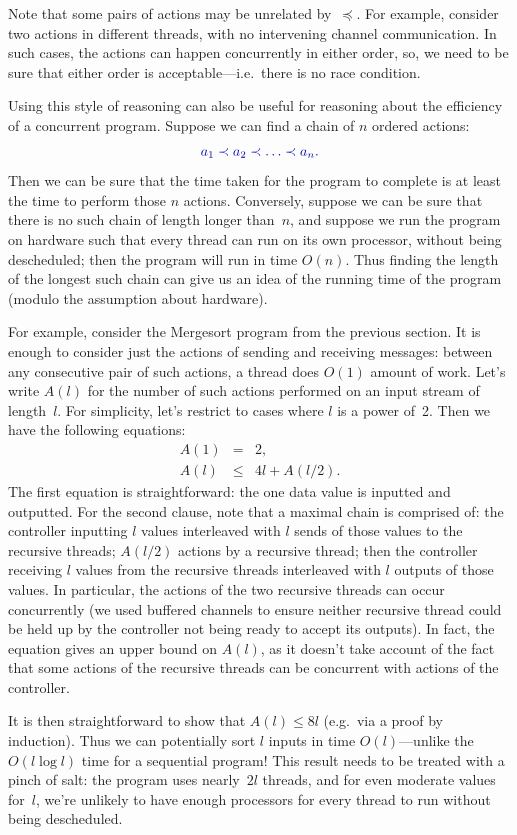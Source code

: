 Note that some pairs of actions may be unrelated by~$\preceq$.  For example,
consider two actions in different threads, with no intervening channel
communication.  In such cases, the actions can happen concurrently in either
order, so, we need to be sure that either order is acceptable---i.e.~there is
no race condition.

Using this style of reasoning can also be useful for reasoning about the
efficiency of a concurrent program.  Suppose we can find a chain of $n$
ordered actions:
\[
\mstyle
a_1 \prec a_2 \prec \ldots \prec a_n. 
\]
Then we can be sure that the time taken for the program to complete is at
least the time to perform those $n$ actions.  Conversely, suppose we can be
sure that there is no such chain of length longer than~$n$, and suppose we run
the program on hardware such that every thread can run on its own processor,
without being descheduled; then the program will run in time $O(n)$.  Thus
finding the length of the longest such chain can give us an idea of the
running time of the program (modulo the assumption about hardware).

For example, consider the Mergesort program from the previous section.  It is
enough to consider just the actions of sending and receiving messages: between
any consecutive pair of such actions, a thread does $O(1)$ amount of work.
Let's write $A(l)$ for the number of such actions performed on an input stream
of length~$l$.  For simplicity, let's restrict to  cases where $l$ is a
power of~2.  Then we have the following equations:
%
\begin{eqnarray*}
A(1) & = & 2, \\
A(l) & \le & 4l+A(l/2).
\end{eqnarray*}
%
The first equation is straightforward: the one data value is inputted and
outputted.  For the second clause, note that a maximal chain is comprised of:
the controller inputting $l$ values interleaved with $l$ sends of those values
to the recursive threads; $A(l/2)$ actions by a recursive thread; then the
controller receiving $l$ values from the recursive threads interleaved with
$l$ outputs of those values.  In particular, the actions of the two recursive
threads can occur concurrently (we used buffered channels to ensure neither
recursive thread could be held up by the controller not being ready to accept
its outputs).  In fact, the equation gives an upper bound on $A(l)$, as it
doesn't take account of the fact that some actions of the recursive threads
can be concurrent with actions of the controller. 

It is then straightforward to show that $A(l) \le 8l$ (e.g.~via a proof by
induction).  Thus we can potentially sort $l$ inputs in time $O(l)$---unlike
the $O(l \log l)$ time for a sequential program!  This result needs to be
treated with a pinch of salt: the program uses nearly~$2l$ threads, and for
even moderate values for~$l$, we're unlikely to have enough processors for
every thread to run without being descheduled.
